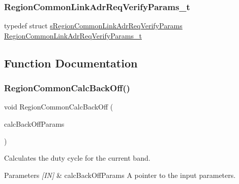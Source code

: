 \subsubsection{\texorpdfstring{Region\+Common\+Link\+Adr\+Req\+Verify\+Params\+\_\+t}{RegionCommonLinkAdrReqVerifyParams\_t}}
{\footnotesize\ttfamily typedef struct \hyperlink{structsRegionCommonLinkAdrReqVerifyParams}{s\+Region\+Common\+Link\+Adr\+Req\+Verify\+Params} \hyperlink{group__REGIONCOMMON_gad186afbaf1b52893ddc3fa5eba88de0a}{Region\+Common\+Link\+Adr\+Req\+Verify\+Params\+\_\+t}}



\subsection{Function Documentation}
\mbox{\label{group__REGIONCOMMON_gae2b1dfba27c79f605048f2d9869dc57d}} 
\subsubsection{\texorpdfstring{Region\+Common\+Calc\+Back\+Off()}{RegionCommonCalcBackOff()}}
{\footnotesize\ttfamily void Region\+Common\+Calc\+Back\+Off (\begin{DoxyParamCaption}\item[{\hyperlink{group__REGIONCOMMON_ga26c2fc7c3e1d929d59b5653a5cd1fc0c}{Region\+Common\+Calc\+Back\+Off\+Params\+\_\+t} $\ast$}]{calc\+Back\+Off\+Params }\end{DoxyParamCaption})}



Calculates the duty cycle for the current band. 


\begin{DoxyParams}{Parameters}
{\em \mbox{[}\+I\+N\mbox{]}} & calc\+Back\+Off\+Params A pointer to the input parameters. \\
\hline
\end{DoxyParams}
\mbox{\label{group__REGIONCOMMON_ga695c0ab2a06edcae5b33772f639fb676}} 
